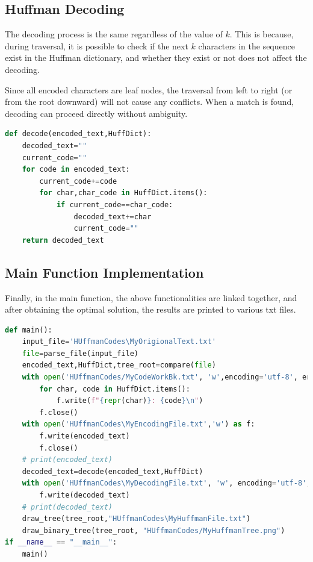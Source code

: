 \documentclass[12pt]{article}
\begin{document}
\subsection{Huffman Decoding}
The decoding process is the same regardless of the value of \( k \). This is because, during traversal, it is possible to check if the next \( k \) characters in the sequence exist in the Huffman dictionary, and whether they exist or not does not affect the decoding. 
\par Since all encoded characters are leaf nodes, the traversal from left to right (or from the root downward) will not cause any conflicts. When a match is found, decoding can proceed directly without ambiguity.
\begin{tcolorbox}[colframe=black, colback=white, boxrule=0.4mm, sharp corners=southwest, title=Decoding Code]
    \begin{lstlisting}[language=Python, breaklines=true]
def decode(encoded_text,HuffDict):
    decoded_text=""
    current_code=""
    for code in encoded_text:
        current_code+=code
        for char,char_code in HuffDict.items():
            if current_code==char_code:
                decoded_text+=char
                current_code=""
    return decoded_text
\end{lstlisting}
\end{tcolorbox}

\subsection{Main Function Implementation}
Finally, in the main function, the above functionalities are linked together, and after obtaining the optimal solution, the results are printed to various txt files.
\begin{tcolorbox}[colframe=black, colback=white, boxrule=0.4mm, sharp corners=southwest, title=Main Function Code]
    \begin{lstlisting}[language=Python, breaklines=true]
def main():
    input_file='HUffmanCodes\MyOrigionalText.txt'
    file=parse_file(input_file)
    encoded_text,HuffDict,tree_root=compare(file)
    with open('HUffmanCodes/MyCodeWorkBk.txt', 'w',encoding='utf-8', errors='replace') as f:
        for char, code in HuffDict.items():
            f.write(f"{repr(char)}: {code}\n")
        f.close()
    with open('HUffmanCodes\MyEncodingFile.txt','w') as f:
        f.write(encoded_text)
        f.close()
    # print(encoded_text)
    decoded_text=decode(encoded_text,HuffDict)
    with open('HUffmanCodes\MyDecodingFile.txt', 'w', encoding='utf-8', errors='replace') as f:
        f.write(decoded_text)
    # print(decoded_text)
    draw_tree(tree_root,"HUffmanCodes\MyHuffmanFile.txt")
    draw_binary_tree(tree_root, "HUffmanCodes/MyHuffmanTree.png")
if __name__ == "__main__":
    main()
\end{lstlisting}
\end{tcolorbox}
\end{document}
